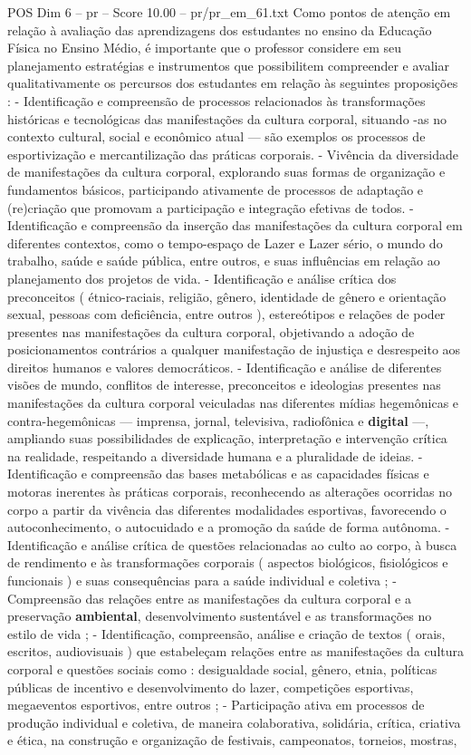 \begin{textsample}{POS Dim 6 – pr – Score 10.00 – pr/pr\_em\_61.txt}
Como pontos de atenção em relação à avaliação das aprendizagens dos estudantes no ensino da Educação Física no Ensino Médio, é importante que o professor considere em seu planejamento estratégias e instrumentos que possibilitem compreender e avaliar qualitativamente os percursos dos estudantes em relação às seguintes proposições : - Identificação e compreensão de processos relacionados às transformações históricas e tecnológicas das manifestações da cultura corporal, situando -as no contexto cultural, social e econômico atual — são exemplos os processos de esportivização e mercantilização das práticas corporais. - Vivência da diversidade de manifestações da cultura corporal, explorando suas formas de organização e fundamentos básicos, participando ativamente de processos de adaptação e (re)criação que promovam a participação e integração efetivas de todos. - Identificação e compreensão da inserção das manifestações da cultura corporal em diferentes contextos, como o tempo-espaço de Lazer e Lazer sério, o mundo do trabalho, saúde e saúde pública, entre outros, e suas influências em relação ao planejamento dos projetos de vida. - Identificação e análise crítica dos preconceitos ( étnico-raciais, religião, gênero, identidade de gênero e orientação sexual, pessoas com deficiência, entre outros ), estereótipos e relações de poder presentes nas manifestações da cultura corporal, objetivando a adoção de posicionamentos contrários a qualquer manifestação de injustiça e desrespeito aos direitos humanos e valores democráticos. - Identificação e análise de diferentes visões de mundo, conflitos de interesse, preconceitos e ideologias presentes nas manifestações da cultura corporal veiculadas nas diferentes mídias hegemônicas e contra-hegemônicas — imprensa, jornal, televisiva, radiofônica e \textbf{digital} —, ampliando suas possibilidades de explicação, interpretação e intervenção crítica na realidade, respeitando a diversidade humana e a pluralidade de ideias. - Identificação e compreensão das bases metabólicas e as capacidades físicas e motoras inerentes às práticas corporais, reconhecendo as alterações ocorridas no corpo a partir da vivência das diferentes modalidades esportivas, favorecendo o autoconhecimento, o autocuidado e a promoção da saúde de forma autônoma. - Identificação e análise crítica de questões relacionadas ao culto ao corpo, à busca de rendimento e às transformações corporais ( aspectos biológicos, fisiológicos e funcionais ) e suas consequências para a saúde individual e coletiva ; - Compreensão das relações entre as manifestações da cultura corporal e a preservação \textbf{ambiental}, desenvolvimento sustentável e as transformações no estilo de vida ; - Identificação, compreensão, análise e criação de textos ( orais, escritos, audiovisuais ) que estabeleçam relações entre as manifestações da cultura corporal e questões sociais como : desigualdade social, gênero, etnia, políticas públicas de incentivo e desenvolvimento do lazer, competições esportivas, megaeventos esportivos, entre outros ; - Participação ativa em processos de produção individual e coletiva, de maneira colaborativa, solidária, crítica, criativa e ética, na construção e organização de festivais, campeonatos, torneios, mostras, 
\end{textsample}
